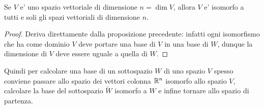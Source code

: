 \begin{proposition}
    Se $V$ e' uno spazio vettoriale di dimensione $n = \dim V$, allora $V$ e' isomorfo a tutti e soli gli spazi vettoriali di dimensione $n$.
\end{proposition}
\begin{proof}
    Deriva direttamente dalla proposizione precedente: infatti ogni isomorfismo che ha come dominio $V$ deve portare una base di $V$ in una base di $W$, dunque la dimensione di $V$ deve essere uguale a quella di $W$.
\end{proof}

Quindi per calcolare una base di un sottospazio $W$ di uno spazio $V$ spesso conviene passare allo spazio dei vettori colonna $\mathbb{R}^n$ isomorfo allo spazio $V$, calcolare la base del sottospazio $\tilde{W}$ isomorfo a $W$ e infine tornare allo spazio di partenza.

